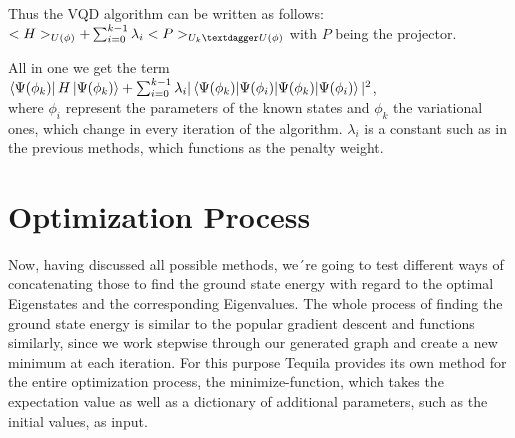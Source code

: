 \documentclass[
  letterpaper,
  DIV=11,
  numbers=noendperiod]{scrartcl}
\begin{document}
Thus the VQD algorithm can be written as follows:\\
\(<H>_{U(\phi)} + \sum_{i=0}^{k-1} \lambda_{i} <P>_{U_{k}{\textdagger} U(\phi)}\)
with \(P\) being the projector.

All in one we get the term
\(\bra{\Psi(\phi _{k})}H\ket{\Psi(\phi _{k})} + \sum_{i=0}^{k-1} \lambda_{i} |\braket{\Psi(\phi _{k}) | \Psi(\phi _{i})}|^2\),\\
where \(\phi _{i}\) represent the parameters of the known states and
\(\phi _{k}\) the variational ones, which change in every iteration of
the algorithm. \(\lambda_{i}\) is a constant such as in the previous
methods, which functions as the penalty weight.\\

\section{Optimization Process}\label{optimization-process}

Now, having discussed all possible methods, we´re going to test
different ways of concatenating those to find the ground state energy
with regard to the optimal Eigenstates and the corresponding
Eigenvalues. The whole process of finding the ground state energy is
similar to the popular gradient descent and functions similarly, since
we work stepwise through our generated graph and create a new minimum at
each iteration. For this purpose Tequila provides its own method for the
entire optimization process, the minimize-function, which takes the
expectation value as well as a dictionary of additional parameters, such
as the initial values, as input.
\end{document}
